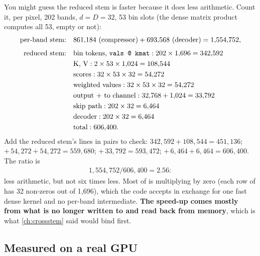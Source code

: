 You might guess the reduced stem is faster because it does less arithmetic. Count it, per pixel, 202 bands, $d = D = 32$, 53 bin slots (the dense matrix product computes all 53, empty or not):
\begin{align*}
  \text{per-band stem:}\quad & 861{,}184 \text{ (compressor)} + 693{,}568 \text{ (decoder)} = 1{,}554{,}752,\\[4pt]
  \text{reduced stem:}\quad & \text{bin tokens, \texttt{vals @ kmat}}: 202\times1{,}696 = 342{,}592\\
  & \text{K, V}: 2\times53\times1{,}024 = 108{,}544\\
  & \text{scores}: 32\times53\times32 = 54{,}272\\
  & \text{weighted values}: 32\times53\times32 = 54{,}272\\
  & \text{output + to channel}: 32{,}768 + 1{,}024 = 33{,}792\\
  & \text{skip path}: 202\times32 = 6{,}464\\
  & \text{decoder}: 202\times32 = 6{,}464\\
  & \text{total}: 606{,}400 .
\end{align*}
Add the reduced stem's lines in pairs to check: $342{,}592 + 108{,}544 = 451{,}136$; $+\,54{,}272 + 54{,}272 = 559{,}680$; $+\,33{,}792 = 593{,}472$; $+\,6{,}464 + 6{,}464 = 606{,}400$. The ratio is
\begin{align*}
  1{,}554{,}752/606{,}400 = 2.56:
\end{align*}
less arithmetic, but not six times less. Most of  is multiplying by zero (each row of  has 32 non-zeros out of 1,696), which the code accepts in exchange for one fast dense kernel and no per-band intermediate. \textbf{The speed-up comes mostly from what is no longer written to and read back from memory}, which is what \cref{ch:crossstem} said would bind first.

\subsection{Measured on a real GPU}


